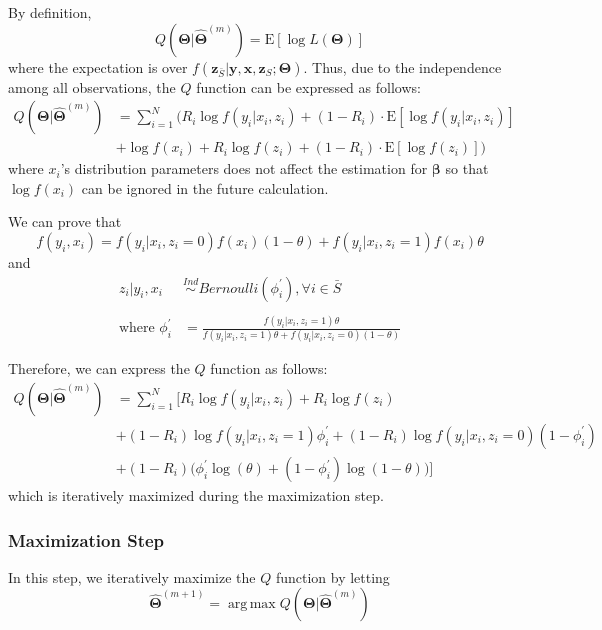 \documentclass[
  12pt,
]{article}
\begin{document}
By definition, \[
Q(\boldsymbol{\Theta} | \hat{\boldsymbol{\Theta}}^{(m)}) = \mathrm{E}[\log L(\boldsymbol\Theta)]
\] where the expectation is over
\(f(\boldsymbol{z}_{\bar{S}} | \boldsymbol{y}, \boldsymbol{x}, \boldsymbol{z}_{S}; \boldsymbol{\Theta})\).
Thus, due to the independence among all observations, the \(Q\) function
can be expressed as follows: \[
\begin{aligned}
Q(\boldsymbol{\Theta} | \hat{\boldsymbol{\Theta}}^{(m)}) &= \sum_{i = 1}^{N} \Big( 
R_i \log f(y_i|x_i, z_i) + (1 - R_i) \cdot \mathrm{E}[\log f(y_i|x_i, z_i)] \\
&+ \log f(x_i) + 
R_i \log f(z_i) + (1 - R_i) \cdot \mathrm{E}[\log f(z_i)]
\Big)
\end{aligned}
\] where \(x_i\)'s distribution parameters does not affect the
estimation for \(\boldsymbol{\beta}\) so that \(\log f(x_i)\) can be
ignored in the future calculation.

We can prove that \[
f(y_i, x_i) = f(y_i|x_i, z_i = 0) f(x_i) (1 - \theta) + f(y_i | x_i, z_i = 1) f(x_i) \theta
\] and \[
\begin{aligned}
z_i | y_i, x_i &\overset{Ind}{\sim} Bernoulli (\phi^{\prime}_i), \forall i \in \bar{S} \\
\\
\text{where } \phi^{\prime}_i &= \frac{f(y_i|x_i, z_i = 1)\theta}{f(y_i|x_i, z_i = 1)\theta + f(y_i|x_i, z_i = 0)(1 - \theta)}
\end{aligned}
\]

Therefore, we can express the \(Q\) function as follows: \[
\begin{aligned}
Q(\boldsymbol{\Theta} | \hat{\boldsymbol{\Theta}}^{(m)}) &= \sum_{i = 1}^{N} \Big[
R_i \log f(y_i | x_i, z_i) + R_i \log f(z_i) \\
&+ (1-R_i) \log f(y_i | x_i, z_i = 1) \phi_i^{\prime} + (1-R_i) \log f(y_i | x_i, z_i = 0) (1- \phi_i^{\prime}) \\
&+ (1-R_i)\big( \phi_i^{\prime} \log(\theta) + (1-\phi_i^{\prime}) \log(1 - \theta) \big) \Big] 
\end{aligned}
\] which is iteratively maximized during the maximization step.

\hypertarget{maximization-step}{%
\subsubsection{Maximization Step}\label{maximization-step}}

In this step, we iteratively maximize the \(Q\) function by letting \[
\hat{\boldsymbol{\Theta}}^{(m+1)} =  \operatorname*{arg\,max} Q(\boldsymbol{\Theta} | \hat{\boldsymbol{\Theta}}^{(m)})
\]
\end{document}
